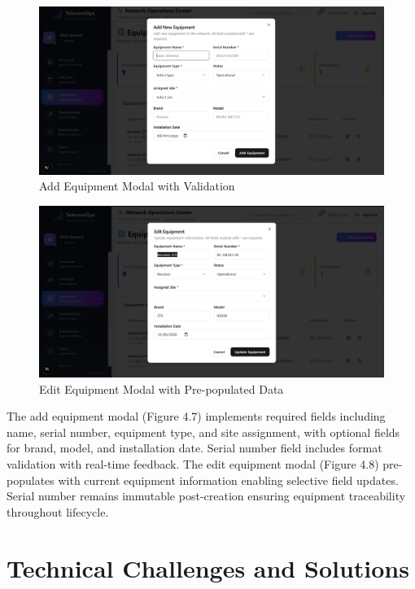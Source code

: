 \begin{figure}[H]
    \centering
    \includegraphics[width=0.9\linewidth]{img/chap_04/add_equipment_dialog.png}
    \caption{Add Equipment Modal with Validation}
    \label{fig:add_equipment_modal}
\end{figure}

\begin{figure}[H]
    \centering
    \includegraphics[width=0.9\linewidth]{img/chap_04/edit_equipment_dialog.png}
    \caption{Edit Equipment Modal with Pre-populated Data}
    \label{fig:edit_equipment_modal}
\end{figure}

The add equipment modal (Figure 4.7) implements required fields including name, serial number, equipment type, and site assignment, with optional fields for brand, model, and installation date. Serial number field includes format validation with real-time feedback. The edit equipment modal (Figure 4.8) pre-populates with current equipment information enabling selective field updates. Serial number remains immutable post-creation ensuring equipment traceability throughout lifecycle.

\section{Technical Challenges and Solutions}

